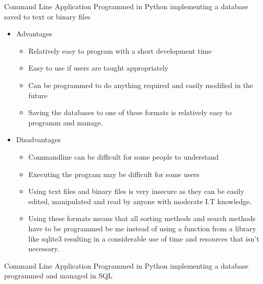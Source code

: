 Command Line Application Programmed in Python implementing a database saved to text or binary files

\begin{itemize}
	\item Advantages
	\begin{itemize}
		\item Relatively easy to program with a short development time
		\item Easy to use if users are taught appropriately
		\item Can be programmed to do anything required and easily modified in the future
		\item Saving the databases to one of these formats is relatively easy to programm and manage.
	\end{itemize}
	\item Disadvantages
	\begin{itemize}
		\item Commandline can be difficult for some people to understand 
		\item Executing the program may be difficult for some users
		\item Using text files and binary files is very insecure as they can be easily edited, manipulated and read by anyone with moderate I.T knowledge.
		\item Using these formats means that all sorting methods and search methods have to be programmed be me instead of using a function from a library like sqlite3 resulting in a considerable use of time and resources that isn't necessary.
	\end{itemize}
\end{itemize}

Command Line Application Programmed in Python implementing a database programmed and managed in SQL

